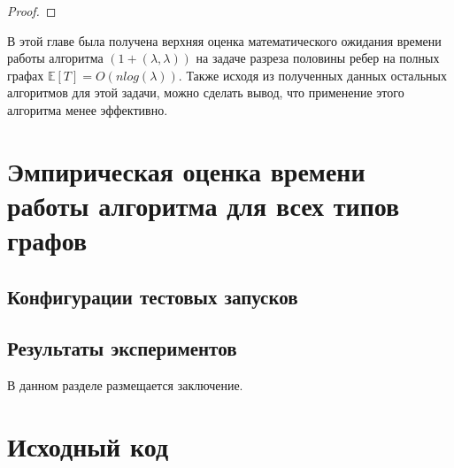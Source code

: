 \documentclass[times]{itmo-student-thesis}
\newcommand{\alglambda}{${(1 + (\lambda , \lambda))}$\xspace}
\begin{document}
\begin{proof}

\end{proof}
\chapterconclusion

В этой главе была получена верхняя оценка математического ожидания времени работы алгоритма \alglambda на задаче разреза половины ребер на полных графах $\mathbb{E}[T]=O(nlog(\lambda))$. Также исходя из полученных данных остальных алгоритмов для этой задачи, можно сделать вывод, что применение этого алгоритма менее эффективно.
\chapter{Эмпирическая оценка времени работы алгоритма для всех типов графов}

\section{Конфигурации тестовых запусков}

\section{Результаты экспериментов}

\chapterconclusion


\startconclusionpage

В данном разделе размещается заключение.

\printmainbibliography

\appendix

\chapter{Исходный код}\label{sec:app:1}
\end{document}
